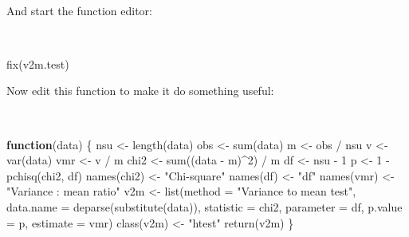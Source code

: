 \documentclass[
  12pt,
  a4paper]{book}
\newenvironment{Shaded}{\begin{snugshade}}{\end{snugshade}}
\newcommand{\AttributeTok}[1]{\textcolor[rgb]{0.77,0.63,0.00}{#1}}
\newcommand{\ControlFlowTok}[1]{\textcolor[rgb]{0.13,0.29,0.53}{\textbf{#1}}}
\newcommand{\DecValTok}[1]{\textcolor[rgb]{0.00,0.00,0.81}{#1}}
\newcommand{\FunctionTok}[1]{\textcolor[rgb]{0.00,0.00,0.00}{#1}}
\newcommand{\NormalTok}[1]{#1}
\newcommand{\OtherTok}[1]{\textcolor[rgb]{0.56,0.35,0.01}{#1}}
\newcommand{\SpecialCharTok}[1]{\textcolor[rgb]{0.00,0.00,0.00}{#1}}
\newcommand{\StringTok}[1]{\textcolor[rgb]{0.31,0.60,0.02}{#1}}
\begin{document}
~

And start the function editor:

~

\begin{Shaded}
\begin{Highlighting}[]
\FunctionTok{fix}\NormalTok{(v2m.test)}
\end{Highlighting}
\end{Shaded}

\newpage

Now edit this function to make it do something useful:

~

\begin{Shaded}
\begin{Highlighting}[]
\ControlFlowTok{function}\NormalTok{(data) \{}
\NormalTok{  nsu }\OtherTok{\textless{}{-}} \FunctionTok{length}\NormalTok{(data)}
\NormalTok{  obs }\OtherTok{\textless{}{-}} \FunctionTok{sum}\NormalTok{(data)}
\NormalTok{  m }\OtherTok{\textless{}{-}}\NormalTok{ obs }\SpecialCharTok{/}\NormalTok{ nsu}
\NormalTok{  v }\OtherTok{\textless{}{-}} \FunctionTok{var}\NormalTok{(data)}
\NormalTok{  vmr }\OtherTok{\textless{}{-}}\NormalTok{ v }\SpecialCharTok{/}\NormalTok{ m}
\NormalTok{  chi2 }\OtherTok{\textless{}{-}} \FunctionTok{sum}\NormalTok{((data }\SpecialCharTok{{-}}\NormalTok{ m)}\SpecialCharTok{\^{}}\DecValTok{2}\NormalTok{) }\SpecialCharTok{/}\NormalTok{ m}
\NormalTok{  df }\OtherTok{\textless{}{-}}\NormalTok{ nsu }\SpecialCharTok{{-}} \DecValTok{1}
\NormalTok{  p }\OtherTok{\textless{}{-}} \DecValTok{1} \SpecialCharTok{{-}} \FunctionTok{pchisq}\NormalTok{(chi2, df)}
  \FunctionTok{names}\NormalTok{(chi2) }\OtherTok{\textless{}{-}} \StringTok{"Chi{-}square"}
  \FunctionTok{names}\NormalTok{(df) }\OtherTok{\textless{}{-}} \StringTok{"df"}
  \FunctionTok{names}\NormalTok{(vmr) }\OtherTok{\textless{}{-}} \StringTok{"Variance : mean ratio"}
\NormalTok{  v2m }\OtherTok{\textless{}{-}} \FunctionTok{list}\NormalTok{(}\AttributeTok{method =} \StringTok{"Variance to mean test"}\NormalTok{,}
              \AttributeTok{data.name =} \FunctionTok{deparse}\NormalTok{(}\FunctionTok{substitute}\NormalTok{(data)),}
              \AttributeTok{statistic =}\NormalTok{ chi2,}
              \AttributeTok{parameter =}\NormalTok{ df,}
              \AttributeTok{p.value =}\NormalTok{ p,}
              \AttributeTok{estimate =}\NormalTok{ vmr)}
  \FunctionTok{class}\NormalTok{(v2m) }\OtherTok{\textless{}{-}} \StringTok{"htest"}
  \FunctionTok{return}\NormalTok{(v2m)}
\NormalTok{\}}
\end{Highlighting}
\end{Shaded}
\end{document}
